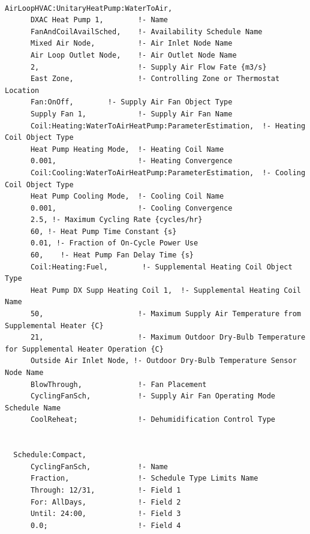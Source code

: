 \begin{lstlisting}

AirLoopHVAC:UnitaryHeatPump:WaterToAir,
      DXAC Heat Pump 1,        !- Name
      FanAndCoilAvailSched,    !- Availability Schedule Name
      Mixed Air Node,          !- Air Inlet Node Name
      Air Loop Outlet Node,    !- Air Outlet Node Name
      2,                       !- Supply Air Flow Fate {m3/s}
      East Zone,               !- Controlling Zone or Thermostat Location
      Fan:OnOff,        !- Supply Air Fan Object Type
      Supply Fan 1,            !- Supply Air Fan Name
      Coil:Heating:WaterToAirHeatPump:ParameterEstimation,  !- Heating Coil Object Type
      Heat Pump Heating Mode,  !- Heating Coil Name
      0.001,                   !- Heating Convergence
      Coil:Cooling:WaterToAirHeatPump:ParameterEstimation,  !- Cooling Coil Object Type
      Heat Pump Cooling Mode,  !- Cooling Coil Name
      0.001,                   !- Cooling Convergence
      2.5, !- Maximum Cycling Rate {cycles/hr}
      60, !- Heat Pump Time Constant {s}
      0.01, !- Fraction of On-Cycle Power Use
      60,    !- Heat Pump Fan Delay Time {s}
      Coil:Heating:Fuel,        !- Supplemental Heating Coil Object Type
      Heat Pump DX Supp Heating Coil 1,  !- Supplemental Heating Coil Name
      50,                      !- Maximum Supply Air Temperature from Supplemental Heater {C}
      21,                      !- Maximum Outdoor Dry-Bulb Temperature for Supplemental Heater Operation {C}
      Outside Air Inlet Node, !- Outdoor Dry-Bulb Temperature Sensor Node Name
      BlowThrough,             !- Fan Placement
      CyclingFanSch,           !- Supply Air Fan Operating Mode Schedule Name
      CoolReheat;              !- Dehumidification Control Type


  Schedule:Compact,
      CyclingFanSch,           !- Name
      Fraction,                !- Schedule Type Limits Name
      Through: 12/31,          !- Field 1
      For: AllDays,            !- Field 2
      Until: 24:00,            !- Field 3
      0.0;                     !- Field 4





\end{lstlisting}
